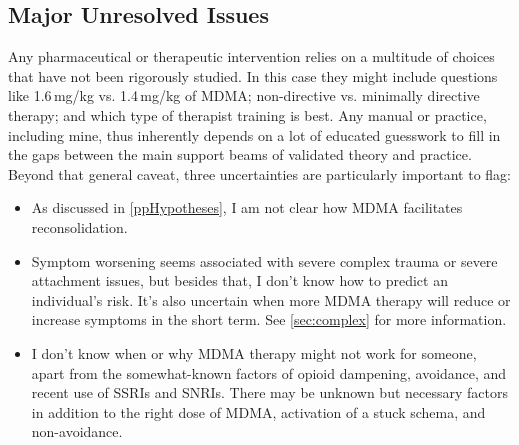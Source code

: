 \documentclass[11pt,oneside]{book}
\begin{document}
\subsection*{Major Unresolved Issues}
Any pharmaceutical or therapeutic intervention relies on a multitude of choices that have not been rigorously studied. In this case they might include questions like 1.6\,mg/kg vs. 1.4\,mg/kg of MDMA; non-directive vs. minimally directive therapy; and which type of therapist training is best. Any manual or practice, including mine, thus inherently depends on a lot of educated guesswork to fill in the gaps between the main support beams of validated theory and practice. Beyond that general caveat, three uncertainties are particularly important to flag:
\begin{itemize}
    \item As discussed in \cref{ppHypotheses}, I am not clear how MDMA facilitates reconsolidation.
    \item Symptom worsening seems associated with severe complex trauma or severe attachment issues, but besides that, I don't know how to predict an individual's risk. It's also uncertain when more MDMA therapy will reduce or increase symptoms in the short term. See \cref{sec:complex} for more information.
    \item I don't know when or why MDMA therapy might not work for someone, apart from the somewhat-known factors of opioid dampening, avoidance, and recent use of SSRIs and SNRIs. There may be unknown but necessary factors in addition to the right dose of MDMA, activation of a stuck schema, and non-avoidance.
\end{itemize}
\end{document}
